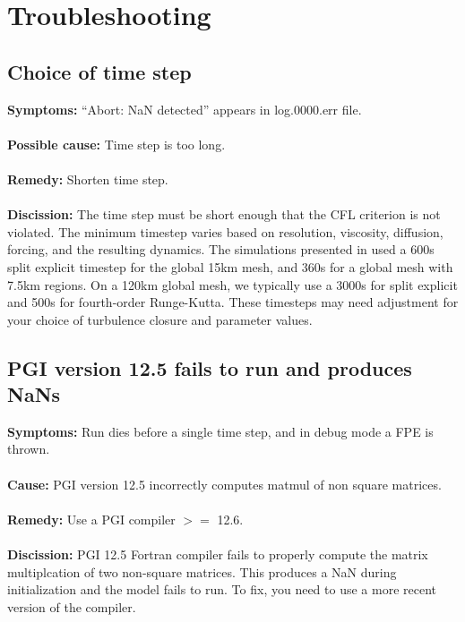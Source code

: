\chapter{Troubleshooting}
\label{chap:troubleshooting}

\section{Choice of time step}

{\bf Symptoms:} ``Abort: NaN detected'' appears in log.0000.err file.
\\ \\
{\bf Possible cause:} Time step is too long.
\\ \\
{\bf Remedy:}  Shorten time step.  
\\ \\
{\bf Discission:}  The time step must be short enough that the CFL criterion is not violated.  The minimum timestep varies based on resolution, viscosity, diffusion, forcing, and the resulting dynamics.  The simulations presented in \citet{Ringler_ea13om} used a 600s split explicit timestep for the global 15km mesh, and 360s for a global mesh with 7.5km regions.  On a 120km global mesh, we typically use a 3000s for split explicit and 500s for fourth-order Runge-Kutta.  These timesteps may need adjustment for your choice of turbulence closure and parameter values.

\section{PGI version 12.5 fails to run and produces NaNs}

{\bf Symptoms:} Run dies before a single time step, and in debug mode a FPE is thrown.
\\ \\
{\bf Cause:} PGI version 12.5 incorrectly computes matmul of non square matrices.
\\ \\
{\bf Remedy:}  Use a PGI compiler $>=$ 12.6.
\\ \\
{\bf Discission:}  PGI 12.5 Fortran compiler fails to properly compute the matrix multiplcation of two non-square matrices. This produces a NaN during initialization and the model fails to run. To fix, you need to use a more recent version of the compiler.




